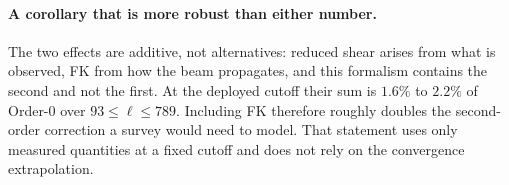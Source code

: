 \paragraph{A corollary that is more robust than either number.} The two
effects are additive, not alternatives: reduced shear arises from what is
observed, FK from how the beam propagates, and this formalism contains the
second and not the first. At the deployed cutoff their sum is $1.6\%$ to
$2.2\%$ of Order-0 over $93\le\ell\le789$. Including FK therefore roughly
doubles the second-order correction a survey would need to model. That
statement uses only measured quantities at a fixed cutoff and does not rely
on the convergence extrapolation.

